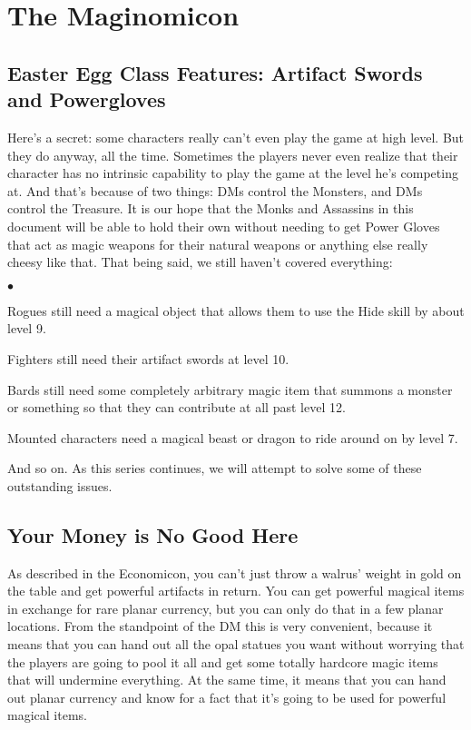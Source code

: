 \section{The Maginomicon}
\vspace*{-10pt}

\subsection{Easter Egg Class Features: Artifact Swords and Powergloves}

Here's a secret: some characters really can't even play the game at high level. But they do anyway, all the time. Sometimes the players never even realize that their character has no intrinsic capability to play the game at the level he's competing at. And that's because of two things: DMs control the Monsters, and DMs control the Treasure. It is our hope that the Monks and Assassins in this document will be able to hold their own without needing to get Power Gloves that act as magic weapons for their natural weapons or anything else really cheesy like that. That being said, we still haven't covered everything:

\begin{list}{$\bullet$}{\itemspace}
    \item Rogues still need a magical object that allows them to use the Hide skill by about level 9.
    \item Fighters still need their artifact swords at level 10.
    \item Bards still need some completely arbitrary magic item that summons a monster or something so that they can contribute at all past level 12.
    \item Mounted characters need a magical beast or dragon to ride around on by level 7.
\end{list}


And so on. As this series continues, we will attempt to solve some of these outstanding issues.

\subsection{Your Money is No Good Here}

As described in the Economicon, you can't just throw a walrus' weight in gold on the table and get powerful artifacts in return. You can get powerful magical items in exchange for rare planar currency, but you can only do that in a few planar locations. From the standpoint of the DM this is very convenient, because it means that you can hand out all the opal statues you want without worrying that the players are going to pool it all and get some totally hardcore magic items that will undermine everything. At the same time, it means that you can hand out planar currency and know for a fact that it's going to be used for powerful magical items.

